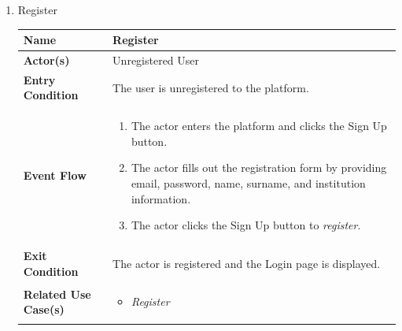 \newpage
\begin{enumerate}
    \item Register
    \begin{center}
        \begin{tabular}{ | m{10em} | m{10cm}| } 
          \hline
          \textbf{Name} & Register  \\ 
          \hline
         \textbf{Actor(s)} & Unregistered User \\ 
          \hline
          \textbf{Entry Condition} & The user is unregistered to the platform. \\ 
          \hline
          \textbf{Event Flow} & 
          \begin{enumerate}[(1)]
              \item The actor enters the platform and clicks the Sign Up button.
              \item The actor fills out the registration form by providing email, password, name, surname, and institution information.
              \item The actor clicks the Sign Up button to \textit{register}.
          \end{enumerate} \\
          \hline
          \textbf{Exit Condition} & The actor is registered and the Login page is displayed.  \\ 
          \hline
          \textbf{Related Use Case(s)} & 
            \begin{itemize}
                \item \textit{Register}
            \end{itemize}  \\ 
          \hline
        \end{tabular}
        \label{tbl:uc1}
    \end{center}

 
    

\end{enumerate}
